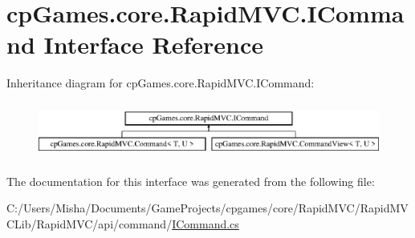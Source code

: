 \hypertarget{interfacecp_games_1_1core_1_1_rapid_m_v_c_1_1_i_command}{}\section{cp\+Games.\+core.\+Rapid\+M\+V\+C.\+I\+Command Interface Reference}
\label{interfacecp_games_1_1core_1_1_rapid_m_v_c_1_1_i_command}
Inheritance diagram for cp\+Games.\+core.\+Rapid\+M\+V\+C.\+I\+Command\+:\begin{figure}[H]
\begin{center}
\leavevmode
\includegraphics[height=1.854305cm]{interfacecp_games_1_1core_1_1_rapid_m_v_c_1_1_i_command}
\end{center}
\end{figure}


The documentation for this interface was generated from the following file\+:\begin{DoxyCompactItemize}
\item 
C\+:/\+Users/\+Misha/\+Documents/\+Game\+Projects/cpgames/core/\+Rapid\+M\+V\+C/\+Rapid\+M\+V\+C\+Lib/\+Rapid\+M\+V\+C/api/command/\mbox{\hyperlink{_i_command_8cs}{I\+Command.\+cs}}\end{DoxyCompactItemize}
